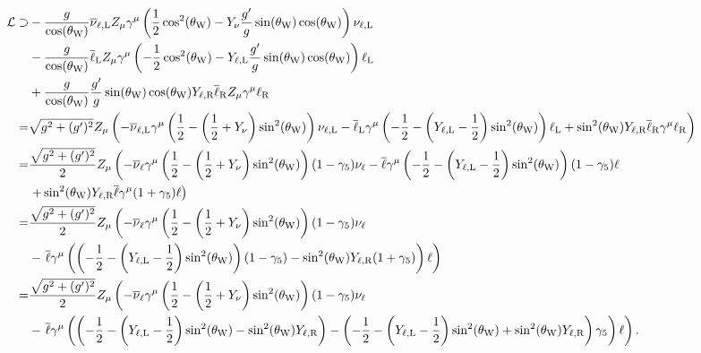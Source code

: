 \begin{align*}
	\mathcal{L} \supset& -\frac{g}{\cos(\theta_{\text{W}})}\overline{\nu}_{\ell, \text{L}}Z_{\mu}\gamma^{\mu}\left(\frac{1}{2}\cos[2](\theta_{\text{W}}) - Y_{\nu}\frac{g^{\prime}}{g}\sin(\theta_{\text{W}})\cos(\theta_{\text{W}})\right)\nu_{\ell, \text{L}} \\
	&- \frac{g}{\cos(\theta_{\text{W}})}\overline{\ell}_{\text{L}}Z_{\mu}\gamma^{\mu}\left(-\frac{1}{2}\cos[2](\theta_{\text{W}}) - Y_{\ell, \text{L}}\frac{g^{\prime}}{g}\sin(\theta_{\text{W}})\cos(\theta_{\text{W}})\right)\ell_{\text{L}} \\
	&+ \frac{g}{\cos(\theta_{\text{W}})}\frac{g^{\prime}}{g}\sin(\theta_{\text{W}})\cos(\theta_{\text{W}})Y_{\ell, \text{R}}\overline{\ell}_{\text{R}}Z_{\mu}\gamma^{\mu}\ell_{\text{R}} \\
	=& \sqrt{g^{2} + (g^{\prime})^{2}}Z_{\mu}\left(-\overline{\nu}_{\ell, \text{L}}\gamma^{\mu}\left(\frac{1}{2} - \left(\frac{1}{2} + Y_{\nu}\right)\sin[2](\theta_{\text{W}})\right)\nu_{\ell, \text{L}} - \overline{\ell}_{\text{L}}\gamma^{\mu}\left(-\frac{1}{2} - \left(Y_{\ell, \text{L}} - \frac{1}{2}\right)\sin[2](\theta_{\text{W}})\right)\ell_{\text{L}} + \sin[2](\theta_{\text{W}})Y_{\ell, \text{R}}\overline{\ell}_{\text{R}}\gamma^{\mu}\ell_{\text{R}}\right) \\
	=& \frac{\sqrt{g^{2} + (g^{\prime})^{2}}}{2}Z_{\mu}\left(-\overline{\nu}_{\ell}\gamma^{\mu}\left(\frac{1}{2} - \left(\frac{1}{2} + Y_{\nu}\right)\sin[2](\theta_{\text{W}})\right)(1 - \gamma_{5})\nu_{\ell} - \overline{\ell}\gamma^{\mu}\left(-\frac{1}{2} - \left(Y_{\ell, \text{L}} - \frac{1}{2}\right)\sin[2](\theta_{\text{W}})\right)(1 - \gamma_{5})\ell \right. \\
	 &\left. + \sin[2](\theta_{\text{W}})Y_{\ell, \text{R}}\overline{\ell}\gamma^{\mu}(1 + \gamma_{5})\ell\right) \\
	=& \frac{\sqrt{g^{2} + (g^{\prime})^{2}}}{2}Z_{\mu}\left(-\overline{\nu}_{\ell}\gamma^{\mu}\left(\frac{1}{2} - \left(\frac{1}{2} + Y_{\nu}\right)\sin[2](\theta_{\text{W}})\right)(1 - \gamma_{5})\nu_{\ell} \right. \\
	 &- \left. \overline{\ell}\gamma^{\mu}\left(\left(-\frac{1}{2} - \left(Y_{\ell, \text{L}} - \frac{1}{2}\right)\sin[2](\theta_{\text{W}})\right)(1 - \gamma_{5}) - \sin[2](\theta_{\text{W}})Y_{\ell, \text{R}}(1 + \gamma_{5})\right)\ell \right) \\
	=& \frac{\sqrt{g^{2} + (g^{\prime})^{2}}}{2}Z_{\mu}\left(-\overline{\nu}_{\ell}\gamma^{\mu}\left(\frac{1}{2} - \left(\frac{1}{2} + Y_{\nu}\right)\sin[2](\theta_{\text{W}})\right)(1 - \gamma_{5})\nu_{\ell} \right. \\
	 &- \left. \overline{\ell}\gamma^{\mu}\left(\left(-\frac{1}{2} - \left(Y_{\ell, \text{L}} - \frac{1}{2}\right)\sin[2](\theta_{\text{W}}) - \sin[2](\theta_{\text{W}})Y_{\ell, \text{R}}\right) - \left(-\frac{1}{2} - \left(Y_{\ell, \text{L}} - \frac{1}{2}\right)\sin[2](\theta_{\text{W}}) + \sin[2](\theta_{\text{W}})Y_{\ell, \text{R}}\right)\gamma_{5}\right)\ell\right).
\end{align*}
